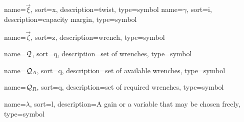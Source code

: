 	{%
		name=\ensuremath{\vec{\xi}},
		sort=x,
		description=twist,
		type=symbol
	}
	\newcommand{\twist}{\gls{sym:twist}}
	{%
		name=\ensuremath{\gamma},
		sort=i,
		description=capacity margin,
		type=symbol
	}
	\newcommand{\capacitymargin}{\gls{sym:capacitymargin}}

	{%
		name=\ensuremath{\vec{\zeta}},
		sort=z,
		description=wrench,
		type=symbol
	}
	\newcommand{\wrench}{\gls{sym:wrench}}

	{%
		name=\ensuremath{\set{Q}},
		sort=q,
		description=set of wrenches,
		type=symbol
	}
	\newcommand{\setofwrenches}{\gls{sym:setofwrenches}}

	{%
		name=\ensuremath{{\set{Q}_A}},
		sort=q,
		description=set of available wrenches,
		type=symbol
	}
	\newcommand{\setofavwrenches}{\gls{sym:setofavwrenches}}

	{%
		name=\ensuremath{{\set{Q}_R}},
		sort=q,
		description=set of required wrenches,
		type=symbol
	}
	\newcommand{\setofreqwrenches}{\gls{sym:setofreqwrenches}}

	{%
		name={\ensuremath{\lambda}},
		sort=l,
		description=A gain or a variable that may be chosen freely,
		type=symbol
	}
	\newcommand{\gain}{\gls{sym:gain}}


